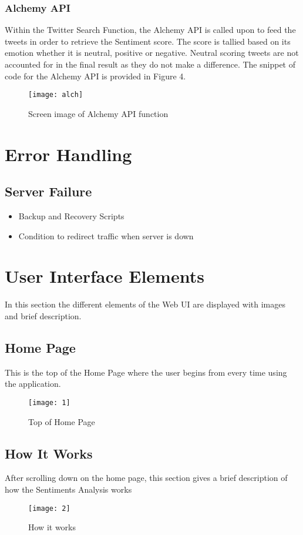 \documentclass[12pt, titlepage]{article}
\begin{document}
\subsubsection{Alchemy API}
Within the Twitter Search Function, the Alchemy API is called upon to feed the tweets in order to retrieve the Sentiment score. The score is tallied based on its emotion whether it is neutral, positive or negative. Neutral scoring tweets are not accounted for in the final result as they do not make a difference. The snippet of code for the Alchemy API is provided in Figure 4.
\begin{figure}[H]
\centering
\texttt{[image: alch]}
\caption{Screen image of Alchemy API  function}
\label{fig:Alchemy}
\end{figure}


\section{Error Handling}
\subsection{Server Failure}
\begin{itemize}
\item Backup and Recovery Scripts
\item Condition to redirect traffic when server is down
\end{itemize}

\newpage
\section{User Interface Elements}
In this section the different elements of the Web UI are displayed with images and brief description.
\subsection{Home Page}
This is the top of the Home Page where the user begins from every time using the application.
\begin{figure}[H]
\centering
\texttt{[image: 1]}
\caption{Top of Home Page}
\label{fig:Result}
\end{figure}


\subsection{How It Works}
After scrolling down on the home page, this section gives a brief description of how the Sentiments Analysis works
\begin{figure}[H]
\centering
\texttt{[image: 2]}
\caption{How it works}
\label{fig:Result}
\end{figure}
\end{document}
